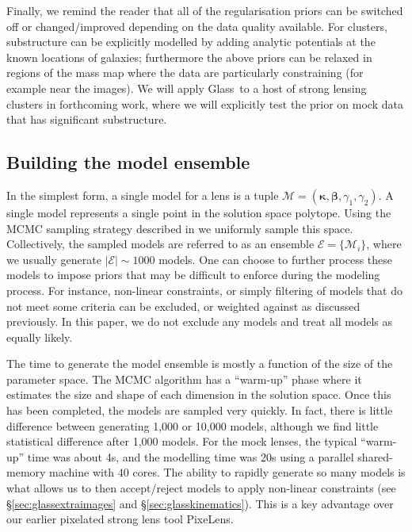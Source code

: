 \documentclass[galley,usenatbib]{mn2e}
\renewcommand{\vec}[1]{\ensuremath{\boldsymbol{#1}}}
\newcommand{\Glass}{{\sc Glass}}
\newcommand{\PixeLens}{{\sc PixeLens}}
\newcommand{\M}{\ensuremath{\mathscr{M}}}
\newcommand{\E}{\ensuremath{\mathscr{E}}}
\newcommand{\secref}[1] {\S\ref{#1}}
\begin{document}
Finally, we remind the reader that all of the regularisation priors can be switched off or changed/improved depending on the data quality available. For clusters, substructure can be explicitly modelled by adding analytic potentials at the known locations of galaxies; furthermore the above priors can be relaxed in regions of the mass map where the data are particularly constraining (for example near the images). We will apply \Glass\ to a host of strong lensing clusters in forthcoming work, where we will explicitly test the prior on mock data that has significant substructure.

\subsection{Building the model ensemble} 

In the simplest form, a single model for a lens is a tuple $\M = (\vec\kappa,
\vec\beta, \gamma_1, \gamma_2)$. A single model represents a single point in
the solution space polytope. Using the MCMC sampling strategy described in
\cite{2012MNRAS.425.3077L} we uniformly sample this space. Collectively, the
sampled models are referred to as an ensemble $\E = \{\M_i\}$, where we usually
generate $|\E| \sim 1000$ models. One can choose to further process these
models to impose priors that may be difficult to enforce during the
modeling process. For instance, non-linear constraints, or simply filtering
of models that do not meet some criteria can be excluded, or weighted against as discussed previously.
In this paper, we do not exclude any models and treat all models
as equally likely.

The time to generate the model ensemble is mostly a function of the size of the
parameter space. The MCMC algorithm has a ``warm-up'' phase where it estimates
the size and shape of each dimension in the solution space.  Once this has been
completed, the models are sampled very quickly. In fact, there is little
difference between generating 1,000 or 10,000 models, although we find little
statistical difference after 1,000 models. For the mock lenses, the typical
``warm-up'' time was about 4s, and the modelling time was 20s using a parallel
shared-memory machine with 40 cores. The ability to rapidly generate so many models is what allows us to then accept/reject models to apply non-linear constraints (see \secref{sec:glassextraimages} and \secref{sec:glasskinematics}). This is a key advantage over our earlier pixelated strong lens tool \PixeLens. 
\end{document}
